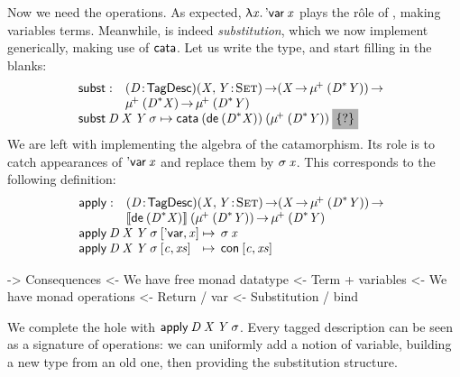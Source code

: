 Now we need the operations. As expected, \(\LAM{\x}\DVar{\x}\)
plays the r\^ole of \return, making variables terms. Meanwhile,
\bind is indeed \emph{substitution}, which we now
implement generically, making use of $\cata$. Let us write the type,
and start filling in the blanks:
%
\[\stk{
\begin{array}{@{}ll}
\subst : & \PITEL{\V{D}}{\TagDesc}
           \PI{\V{X}, \V{Y}}{\Set} 
           (\V{X} \To \mude{(\FreeMonad{\V{D}}{\V{Y}})}) \To \\
         & \mude{(\FreeMonad{\V{D}}{\V{X}})} \To
           \mude{(\FreeMonad{\V{D}}{\V{Y}})} 
\end{array} \\
\subst\: \V{D}\: \V{X}\: \V{Y}\: \V{\sigma} \mapsto
  \cata\: (\toDesc{(\FreeMonad{\V{D}}{\V{X}})})\: 
          (\mude{(\FreeMonad{\V{D}}{\V{Y}})})\: 
          \SHED
}\]
%
We are left with implementing the algebra of the catamorphism. Its
role is to catch appearances of $\DVar{\V{x}}$ and replace them by
$\V{\sigma}\: \V{x}$. This corresponds to the following definition:
%
\[\stk{
\begin{array}{@{}ll}
\apply : & \PITEL{\V{D}}{\TagDesc} 
           \PI{\V{X}, \V{Y}}{\Set} 
           (\V{X} \To \mude{(\FreeMonad{\V{D}}{\V{Y}})}) \To \\
         & \descop{\toDesc{(\FreeMonad{\V{D}}{\V{X}})}}{(\mude{(\FreeMonad{\V{D}}{\V{Y}})})}
           \To  \mude{(\FreeMonad{\V{D}}{\V{Y}})}
\\
\end{array} \\
\begin{array}{@{}l@{\:\mapsto\:\:}l}
\apply\: \V{D}\: \V{X}\: \V{Y}\: \V{\sigma}\: \pair{\SYMBDVar}{\V{x}}{}   & \V{\sigma}\: \V{x}                   \\
\apply\: \V{D}\: \V{X}\: \V{Y}\: \V{\sigma}\: \pair{\V{c}}{\V{xs}}{} & \Con{\pair{\V{c}}{\V{xs}}{}}
\end{array}
}\]

\begin{wstructure}
    -> Consequences
        <- We have free monad datatype
            <- Term + variables
        <- We have monad operations
            <- Return / var
            <- Substitution / bind
\end{wstructure}

We complete the hole with $\apply\: \V{D}\: \V{X}\: \V{Y}\:
\V{\sigma}$. Every tagged
description can be seen as a signature of operations: we can uniformly
add a notion of variable, building a new type from an old one, then
providing the substitution structure.


